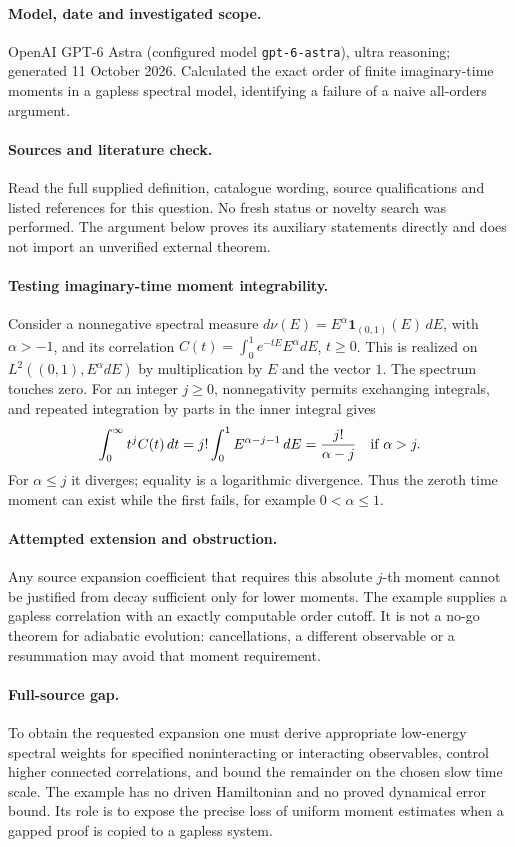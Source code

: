 \documentclass[11pt]{article}
\begin{document}
\paragraph{Model, date and investigated scope.}
OpenAI GPT-6 Astra (configured model \texttt{gpt-6-astra}), ultra reasoning; generated 11 October 2026. Calculated the exact order of finite imaginary-time moments in a gapless spectral model, identifying a failure of a naive all-orders argument.

\paragraph{Sources and literature check.}
Read the full supplied definition, catalogue wording, source qualifications and listed references for this question. No fresh status or novelty search was performed. The argument below proves its auxiliary statements directly and does not import an unverified external theorem.

\paragraph{Testing imaginary-time moment integrability.} Consider a nonnegative spectral measure \(d\nu(E)=E^\alpha\mathbf1_{(0,1)}(E)\,dE\), with \(\alpha>-1\), and its correlation \(C(t)=\int_0^1 e^{-tE}E^\alpha dE\), \(t\geq0\). This is realized on \(L^2((0,1),E^\alpha dE)\) by multiplication by \(E\) and the vector \(1\). The spectrum touches zero. For an integer \(j\geq0\), nonnegativity permits exchanging integrals, and repeated integration by parts in the inner integral gives
\[
 \int_0^\infty t^j C(t)\,dt
 =j!\int_0^1 E^{\alpha-j-1}\,dE
 =\frac{j!}{\alpha-j}\quad\hbox{if }\alpha>j.
\]
For \(\alpha\leq j\) it diverges; equality is a logarithmic divergence. Thus the zeroth time moment can exist while the first fails, for example \(0<\alpha\leq1\).
\paragraph{Attempted extension and obstruction.} Any source expansion coefficient that requires this absolute \(j\)-th moment cannot be justified from decay sufficient only for lower moments. The example supplies a gapless correlation with an exactly computable order cutoff. It is not a no-go theorem for adiabatic evolution: cancellations, a different observable or a resummation may avoid that moment requirement.
\paragraph{Full-source gap.} To obtain the requested expansion one must derive appropriate low-energy spectral weights for specified noninteracting or interacting observables, control higher connected correlations, and bound the remainder on the chosen slow time scale. The example has no driven Hamiltonian and no proved dynamical error bound. Its role is to expose the precise loss of uniform moment estimates when a gapped proof is copied to a gapless system.
\end{document}
